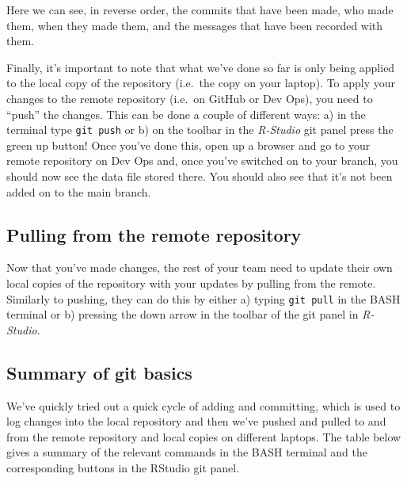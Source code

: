 \documentclass[
  12pt,
]{article}
\begin{document}
Here we can see, in reverse order, the commits that have been made, who
made them, when they made them, and the messages that have been recorded
with them.

Finally, it's important to note that what we've done so far is only
being applied to the local copy of the repository (i.e.~the copy on your
laptop). To apply your changes to the remote repository (i.e.~on GitHub
or Dev Ops), you need to ``push'' the changes. This can be done a couple
of different ways: a) in the terminal type \texttt{git\ push} or b) on
the toolbar in the \emph{R-Studio} git panel press the green up button!
Once you've done this, open up a browser and go to your remote
repository on Dev Ops and, once you've switched on to your branch, you
should now see the data file stored there. You should also see that it's
not been added on to the main branch.

\hypertarget{pulling-from-the-remote-repository}{%
\subsection{Pulling from the remote
repository}\label{pulling-from-the-remote-repository}}

Now that you've made changes, the rest of your team need to update their
own local copies of the repository with your updates by pulling from the
remote. Similarly to pushing, they can do this by either a) typing
\texttt{git\ pull} in the BASH terminal or b) pressing the down arrow in
the toolbar of the git panel in \emph{R-Studio}.

\hypertarget{summary-of-git-basics}{%
\subsection{Summary of git basics}\label{summary-of-git-basics}}

We've quickly tried out a quick cycle of adding and committing, which is
used to log changes into the local repository and then we've pushed and
pulled to and from the remote repository and local copies on different
laptops. The table below gives a summary of the relevant commands in the
BASH terminal and the corresponding buttons in the RStudio git panel.
\end{document}

